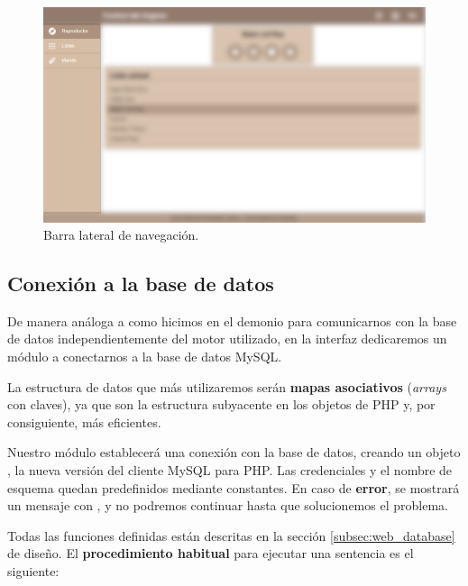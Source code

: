 \smallskip

\begin{figure}[H]
	\noindent \begin{centering}
		\includegraphics[width=\linewidth*2/3]{capitulo5/cap_navigation}
		\par\end{centering}
	\smallskip
	\caption{\label{fig:cap_navigation} Barra lateral de navegación.}
\end{figure} 

\smallskip

\subsection{Conexión a la base de datos}

De manera análoga a como hicimos en el demonio para comunicarnos con la base de datos independientemente del motor utilizado, en la interfaz dedicaremos un módulo a conectarnos a la base de datos MySQL.

La estructura de datos que más utilizaremos serán \textbf{mapas asociativos} (\textit{arrays} con claves), ya que son la estructura subyacente en los objetos de PHP y, por consiguiente, más eficientes.

Nuestro módulo establecerá una conexión con la base de datos, creando un objeto , la nueva versión del cliente MySQL para PHP. Las credenciales y el nombre de esquema quedan predefinidos mediante constantes. En caso de \textbf{error}, se mostrará un mensaje con , y no podremos continuar hasta que solucionemos el problema.

Todas las funciones definidas están descritas en la sección \ref{subsec:web_database} de diseño. El \textbf{procedimiento habitual} para ejecutar una sentencia es el siguiente:


